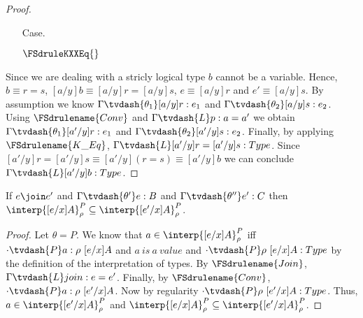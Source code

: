 \begin{proof}
\begin{itemize}
  \item[Case.] \ \\
    \begin{center}
      $\FSdruleKXXEq{}$
    \end{center}
  \end{itemize}
  Since we are dealing with a stricly logical type $b$ cannot be a variable.  Hence, 
  $b \equiv r = s$, $[a/y]b \equiv [a/y]r = [a/y]s$, $e \equiv [a/y]r$ and $e' \equiv [a/y]s$.
  By assumption we know $\Gamma \tvdash{\theta_1} [a/y]r:e_1$ and 
  $\Gamma \tvdash{\theta_2} [a/y]s:e_2$.  Using $\FSdrulename{Conv}$ and 
  $\Gamma \tvdash{L} p:a = a'$ we obtain $\Gamma \tvdash{\theta_1} [a'/y]r:e_1$ and 
  $\Gamma \tvdash{\theta_2} [a'/y]s:e_2$.  Finally, by applying $\FSdrulename{K\_Eq}$,
  $\Gamma \tvdash{L} [a'/y]r = [a'/y]s:Type$.  Since $[a'/y]r = [a'/y]s \equiv 
  [a'/y](r = s) \equiv [a'/y]b$ we can conclude $\Gamma \tvdash{L} [a'/y]b:Type$.
\end{proof}

\begin{lemma}
  \label{lemma:pconv_in_interp_are_equiv}
  If $e \join e'$ and $\Gamma \tvdash{\theta'} e:B$ and 
  $\Gamma \tvdash{\theta''} e':C$ then 
  $\interp{[e/x]A}^P_\rho \subseteq \interp{[e'/x]A}^P_\rho$.
\end{lemma}
\begin{proof}
  Let $\theta = P$.  We know that $a \in \interp{[e/x]A}^P_\rho$
  iff $\cdot \tvdash{P} a:\rho\ [e/x]A$ and $a\ is\ a\ value$ and $
  \cdot \tvdash{P} \rho\ [e/x]A:Type$ 
  by the definition of the interpretation of types.
  By $\FSdrulename{Join}$, $\Gamma \tvdash{L} join:e = e'$. Finally, by 
  $\FSdrulename{Conv}$, 
  $\cdot \tvdash{P} a:\rho\ [e'/x]A$.  Now by regularity $\cdot \tvdash{P} \rho\ [e'/x]A:Type$.
  Thus, $a \in \interp{[e'/x]A}^P_\rho$ and
  $\interp{[e/x]A}^P_\rho \subseteq \interp{[e'/x]A}^P_\rho$.
\end{proof}

